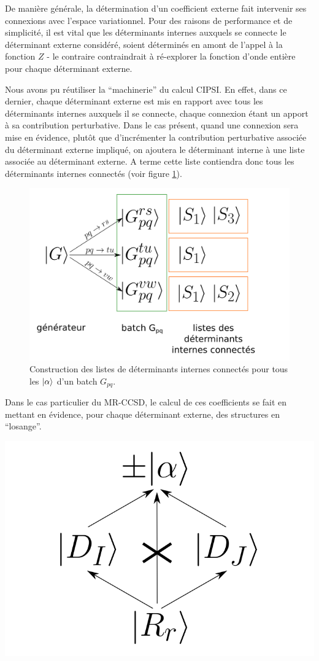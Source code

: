 \documentclass[./thesis.tex]{subfiles}
\begin{document}
De manière générale, la détermination d'un coefficient externe fait intervenir ses connexions avec l'espace variationnel. Pour des raisons de performance et de simplicité, il est vital que les déterminants internes auxquels se connecte le déterminant externe considéré, soient déterminés en amont de l'appel à la fonction $Z$ - le contraire contraindrait à ré-explorer la fonction d'onde entière pour chaque déterminant externe.

Nous avons pu réutiliser la ``machinerie'' du calcul CIPSI. En effet, dans ce dernier, chaque déterminant externe est mis en rapport avec tous les déterminants internes auxquels il se connecte, chaque connexion étant un apport à sa contribution perturbative. Dans le cas présent, quand une connexion sera mise en évidence, plutôt que d'incrémenter la contribution perturbative associée du déterminant externe impliqué, on ajoutera le déterminant interne à une liste associée au déterminant externe. A terme cette liste contiendra donc tous les déterminants internes connectés (voir figure \ref{fig:buildlists_fr}).
\clearpage

\begin{figure}[h!]
        \begin{center}
                \includegraphics[width=0.7\columnwidth]{figures/matrix_dressing/buildlists_fr}
                \caption{Construction des listes de déterminants internes connectés pour tous les ${\ket{\alpha}}$ d'un batch $G_{pq}$.}
                \label{fig:buildlists_fr}
        \end{center}
\end{figure}
Dans le cas particulier du MR-CCSD, le calcul de ces coefficients se fait en mettant en évidence, pour chaque déterminant externe, des structures en ``losange''.
        \begin{center}
                \includegraphics[width=0.3\columnwidth]{figures/matrix_dressing/diamond}
        \end{center}
        
\end{document}
